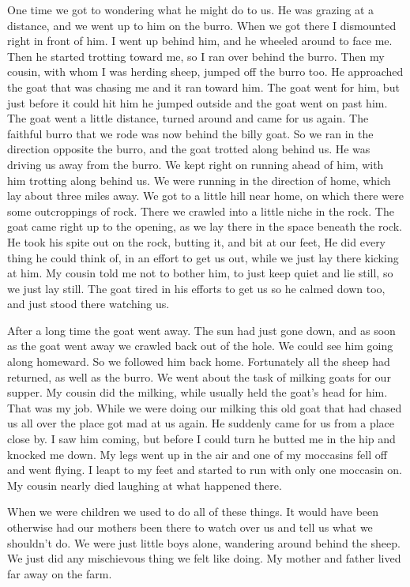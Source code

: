 One time we got to wondering what he might do to us. He was grazing at a distance, and we went up to him on the burro. When we got there I dismounted right in front of him. I went up behind him, and he wheeled around to face me. Then he started trotting toward me, so I ran over behind the burro. Then my cousin, with whom I was herding sheep, jumped off the burro too. He approached the goat that was chasing me and it ran toward him. The goat went for him, but just before it could hit him he jumped outside and the goat went on past him. The goat went a little distance, turned around and came for us again. The faithful burro that we rode was now behind the billy goat. So we ran in the direction opposite the burro, and the goat trotted along behind us. He was driving us away from the burro. We kept right on running ahead of him, with him trotting along behind us. We were running in the direction of home, which lay about three miles away. We got to a little hill near home, on which there were some outcroppings of rock. There we crawled into a little niche in the rock. The goat came right up to the opening, as we lay there in the space beneath the rock. He took his spite out on the rock, butting it, and bit at our feet, He did every thing he could think of, in an effort to get us out, while we just lay there kicking at him. My cousin told me not to bother him, to just keep quiet and lie still, so we just lay still. The goat tired in his efforts to get us so he calmed down too, and just stood there watching us.

After a long time the goat went away. The sun had just gone down, and as soon as the goat went away we crawled back out of the hole. We could see him going along homeward. So we followed him back home. Fortunately all the sheep had returned, as well as the burro. We went about the task of milking goats for our supper. My cousin did the milking, while usually held the goat's head for him. That was my job. While we were doing our milking this old goat that had chased us all over the place got mad at us again. He suddenly came for us from a place close by. I saw him coming, but before I could turn he butted me in the hip and knocked me down. My legs went up in the air and one of my moccasins fell off and went flying. I leapt to my feet and started to run with only one moccasin on. My cousin nearly died laughing at what happened there.

When we were children we used to do all of these things. It would have been otherwise had our mothers been there to watch over us and tell us what we shouldn't do. We were just little boys alone, wandering around behind the sheep. We just did any mischievous thing we felt like doing. My mother and father lived far away on the farm.

